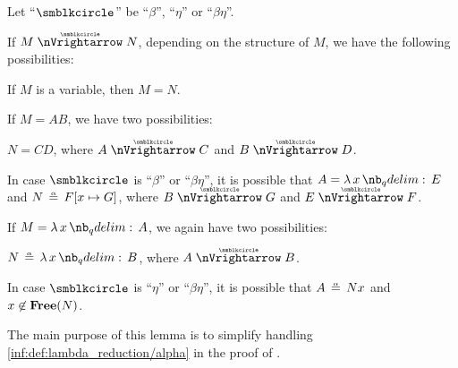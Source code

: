 \begin{lemma}\label{thm:parallel_reduction_deconstruction}
  Let \enquote{\( {\anon} \)} be \enquote{\( \beta \)}, \enquote{\( \eta \)} or \enquote{\( \beta\eta \)}.

  If \( M \ppred N \), depending on the structure of \( M \), we have the following possibilities:
  \begin{thmenum}
     If \( M \) is a variable, then \( M = N \).

     If \( M = AB \), we have two possibilities:
    \begin{thmenum}
       \( N = CD \), where \( A \ppred C \) and \( B \ppred D \).

       In case \( {\anon} \) is \enquote{\( \beta \)} or \enquote{\( \beta\eta \)}, it is possible that \( A = \qabs x E \) and \( N \aequiv F[x \mapsto G] \), where \( B \ppred G \) and \( E \ppred F \).
    \end{thmenum}

     If \( M = \qabs x A \), we again have two possibilities:
    \begin{thmenum}
       \( N \aequiv \qabs x B \), where \( A \ppred B \).

       In case \( {\anon} \) is \enquote{\( \eta \)} or \enquote{\( \beta\eta \)}, it is possible that \( A \aequiv Nx \) and \( x \not\in \op*{Free}(N) \).
    \end{thmenum}
  \end{thmenum}
\end{lemma}
\begin{comments}
  \item The main purpose of this lemma is to simplify handling \ref{inf:def:lambda_reduction/alpha} in the proof of .
\end{comments}
